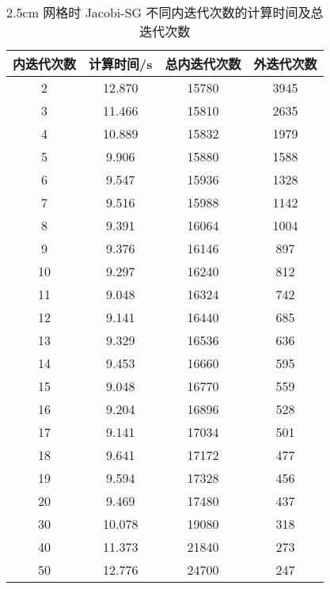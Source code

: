 \begin{datasheet}
\begin{table}
\centering
\caption{2.5cm 网格时 Jacobi-SG 不同内迭代次数的计算时间及总迭代次数}
\label{tab:equsolve.iter.jacobi-sg.2.5cm}
\begin{tabular}{cccc}
\toprule
内迭代次数 & 计算时间/s & 总内迭代次数 & 外迭代次数\\
\midrule
2 & 12.870 & 15780 & 3945\\
3 & 11.466 & 15810 & 2635\\
4 & 10.889 & 15832 & 1979\\
5 & 9.906 & 15880 & 1588\\
6 & 9.547 & 15936 & 1328\\
7 & 9.516 & 15988 & 1142\\
8 & 9.391 & 16064 & 1004\\
9 & 9.376 & 16146 & 897\\
10 & 9.297 & 16240 & 812\\
11 & 9.048 & 16324 & 742\\
12 & 9.141 & 16440 & 685\\
13 & 9.329 & 16536 & 636\\
14 & 9.453 & 16660 & 595\\
15 & 9.048 & 16770 & 559\\
16 & 9.204 & 16896 & 528\\
17 & 9.141 & 17034 & 501\\
18 & 9.641 & 17172 & 477\\
19 & 9.594 & 17328 & 456\\
20 & 9.469 & 17480 & 437\\
30 & 10.078 & 19080 & 318\\
40 & 11.373 & 21840 & 273\\
50 & 12.776 & 24700 & 247\\
\bottomrule
\end{tabular}
\end{table}


\end{datasheet}
